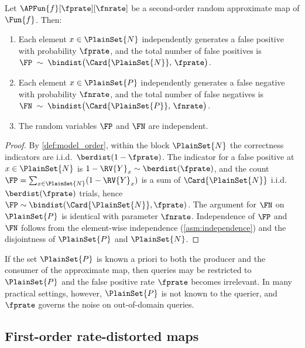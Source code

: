 \documentclass[ ../main.tex]{subfiles}
\begin{document}
\begin{lemma}
\label{prop:binom_errors}
Let $\APFun{f}[\fprate][\fnrate]$ be a second-order random approximate map of
$\Fun{f}$.
Then:
\begin{enumerate}
    \item Each element $x \in \PlainSet{N}$ independently generates a false
          positive with probability $\fprate$, and the total number of false
          positives is
          $\FP \;\sim\; \bindist\!\left(\Card{\PlainSet{N}},\, \fprate\right)$.
    \item Each element $x \in \PlainSet{P}$ independently generates a false
          negative with probability $\fnrate$, and the total number of false
          negatives is
          $\FN \;\sim\; \bindist\!\left(\Card{\PlainSet{P}},\, \fnrate\right)$.
    \item The random variables $\FP$ and $\FN$ are independent.
\end{enumerate}
\end{lemma}
\begin{proof}
By \cref{def:model_order}, within the block $\PlainSet{N}$ the correctness
indicators are i.i.d.\ $\berdist(1-\fprate)$.
The indicator for a false positive at $x \in \PlainSet{N}$ is
$1 - \RV{Y}_x \sim \berdist(\fprate)$, and the count
$\FP = \sum_{x \in \PlainSet{N}} (1 - \RV{Y}_x)$ is a sum of
$\Card{\PlainSet{N}}$ i.i.d.\ $\berdist(\fprate)$ trials, hence
$\FP \sim \bindist(\Card{\PlainSet{N}}, \fprate)$.
The argument for $\FN$ on $\PlainSet{P}$ is identical with parameter $\fnrate$.
Independence of $\FP$ and $\FN$ follows from the element-wise independence
(\cref{asm:independence}) and the disjointness of $\PlainSet{P}$ and
$\PlainSet{N}$.
\end{proof}

\begin{remark}
If the set $\PlainSet{P}$ is known a priori to both the producer and the
consumer of the approximate map, then queries may be restricted to
$\PlainSet{P}$ and the false positive rate $\fprate$ becomes irrelevant.
In many practical settings, however, $\PlainSet{P}$ is not known to the
querier, and $\fprate$ governs the noise on out-of-domain queries.
\end{remark}

\subsection{First-order rate-distorted maps}
\label{sec:first_order}
\end{document}
